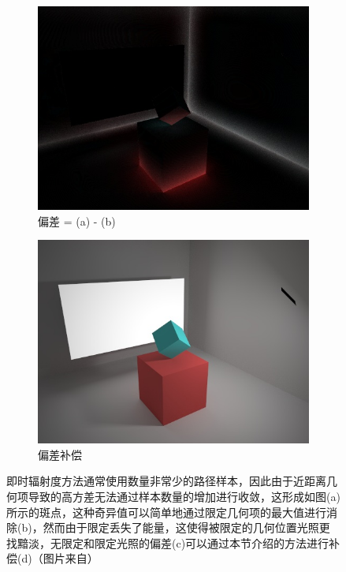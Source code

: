 \begin{figure}
\begin{fullwidth}
\begin{subfigure}[b]{0.246\thewidth}
		\includegraphics[width=1.0\textwidth]{figures/ir/vpl-difference4x}
		\caption{偏差 = (a) - (b)}
	\end{subfigure}
	\begin{subfigure}[b]{0.246\thewidth}
		\includegraphics[width=1.0\textwidth]{figures/ir/vpl-compensated}
		\caption{偏差补偿}
	\end{subfigure}
	\caption{即时辐射度方法通常使用数量非常少的路径样本，因此由于近距离几何项导致的高方差无法通过样本数量的增加进行收敛，这形成如图(a)所示的斑点，这种奇异值可以简单地通过限定几何项的最大值进行消除(b)，然而由于限定丢失了能量，这使得被限定的几何位置光照更找黯淡，无限定和限定光照的偏差(c)可以通过本节介绍的方法进行补偿(d)（图片来自\cite{u:VirtualPointLightBiasCompensation}）}
	\label{f:ir-bias}
\end{fullwidth}
\end{figure}

